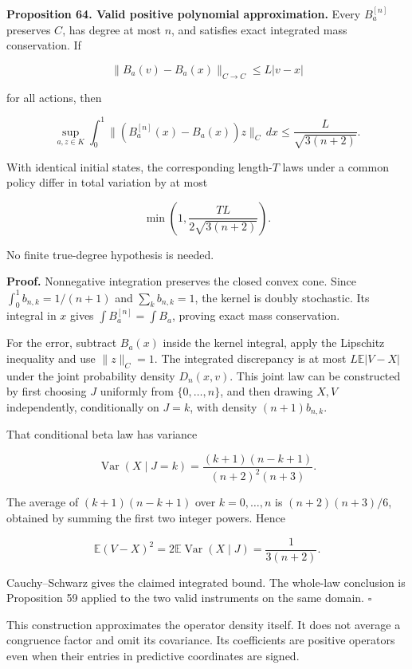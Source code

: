 \documentclass[11pt,letterpaper]{article}
\begin{document}
\textbf{Proposition 64. Valid positive polynomial approximation.} Every
\(B_a^{[n]}\) preserves \(C\), has degree at most \(n\), and satisfies
exact integrated mass conservation. If

\[
\|B_a(v)-B_a(x)\|_{C\to C}\leq L|v-x|
\]

for all actions, then

\[
\boxed{
\sup_{a,z\in K}\int_0^1
\|(B_a^{[n]}(x)-B_a(x))z\|_C\,dx
\leq\frac{L}{\sqrt{3(n+2)}}.
}
\]

With identical initial states, the corresponding length-\(T\) laws under
a common policy differ in total variation by at most

\[
\boxed{\min\left(1,\frac{TL}{2\sqrt{3(n+2)}}\right).}
\]

No finite true-degree hypothesis is needed.

\textbf{Proof.} Nonnegative integration preserves the closed convex
cone. Since \(\int_0^1b_{n,k}=1/(n+1)\) and \(\sum_k b_{n,k}=1\), the
kernel is doubly stochastic. Its integral in \(x\) gives
\(\int B_a^{[n]}=\int B_a\), proving exact mass conservation.

For the error, subtract \(B_a(x)\) inside the kernel integral, apply the
Lipschitz inequality and use \(\|z\|_C=1\). The integrated discrepancy
is at most \(L\mathbb E|V-X|\) under the joint probability density
\(D_n(x,v)\). This joint law can be constructed by first choosing \(J\)
uniformly from \(\{0,\ldots,n\}\), and then drawing \(X,V\)
independently, conditionally on \(J=k\), with density \((n+1)b_{n,k}\).

That conditional beta law has variance

\[
\operatorname{Var}(X\mid J=k)
=\frac{(k+1)(n-k+1)}{(n+2)^2(n+3)}.
\]

The average of \((k+1)(n-k+1)\) over \(k=0,\ldots,n\) is
\((n+2)(n+3)/6\), obtained by summing the first two integer powers.
Hence

\[
\mathbb E(V-X)^2
=2\mathbb E\operatorname{Var}(X\mid J)
=\frac1{3(n+2)}.
\]

Cauchy--Schwarz gives the claimed integrated bound. The whole-law
conclusion is Proposition 59 applied to the two valid instruments on the
same domain. \(\square\)

This construction approximates the operator density itself. It does not
average a congruence factor and omit its covariance. Its coefficients
are positive operators even when their entries in predictive coordinates
are signed.
\end{document}
